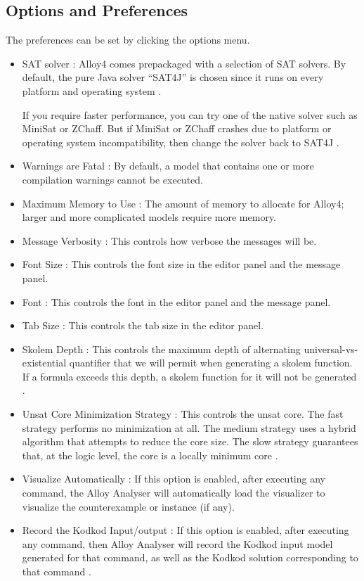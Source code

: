 \documentclass[a4paper,10pt]{report}
\begin{document}
\subsection{Options and Preferences}
\label{Options & Preference}

The preferences can be set by clicking the options menu.
\begin{itemize}
\item SAT solver : Alloy4 comes prepackaged with a selection of SAT solvers. By default, the pure Java solver ``SAT4J” is chosen since it runs on every platform and operating system \cite{DanielJackson}.

If you require faster performance, you can try one of the native solver such as MiniSat or ZChaff. But if MiniSat or ZChaff crashes due to platform or operating system incompatibility, then change the solver back to SAT4J \cite{DanielJackson}.

\item Warnings are Fatal : By default, a model that contains one or more compilation warnings cannot be executed.
\item Maximum Memory to Use : The amount of memory to allocate for Alloy4; larger and more complicated models require more memory.
\item Message Verbosity : This controls how verbose the messages will be.
\item Font Size : This controls the font size in the editor panel and the message panel.
\item Font : This controls the font in the editor panel and the message panel.
\item Tab Size : This controls the tab size in the editor panel.
\item Skolem Depth : This controls the maximum depth of alternating universal-vs-existential quantifier that we will permit when generating a skolem function. If a formula exceeds this depth, a skolem function for it will not be generated \cite{DanielJackson}.
\item Unsat Core Minimization Strategy : This controls the unsat core. The fast strategy performs no minimization at all. The medium strategy uses a hybrid algorithm that attempts to reduce the core size. The slow strategy guarantees that, at the logic level, the core is a locally minimum core \cite{DanielJackson}.
\item Visualize Automatically : If this option is enabled, after executing any command, the Alloy Analyser will automatically load the visualizer to visualize the counterexample or instance (if any)\cite{DanielJackson}.
\item Record the Kodkod Input/output : If this option is enabled, after executing any command, then Alloy Analyser will record the Kodkod input model generated for that command, as well as the Kodkod solution corresponding to that command \cite{DanielJackson}.
\end{itemize}
\end{document}
